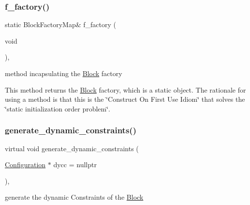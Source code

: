 \subsubsection{\texorpdfstring{f\+\_\+factory()}{f\_factory()}}
{\footnotesize\ttfamily static Block\+Factory\+Map\& f\+\_\+factory (\begin{DoxyParamCaption}\item[{void}]{ }\end{DoxyParamCaption})\hspace{0.3cm}{\ttfamily [static]}, {\ttfamily [protected]}}



method incapsulating the \mbox{\hyperlink{class_s_m_spp__di__unipi__it_1_1_block}{Block}} factory 

This method returns the \mbox{\hyperlink{class_s_m_spp__di__unipi__it_1_1_block}{Block}} factory, which is a static object. The rationale for using a method is that this is the \char`\"{}\+Construct On First Use
\+Idiom\char`\"{} that solves the \char`\"{}static initialization order problem\char`\"{}. \mbox{\label{class_s_m_spp__di__unipi__it_1_1_block_a306892932ce912f30548f3f3e4072e9b}} 
\subsubsection{\texorpdfstring{generate\+\_\+dynamic\+\_\+constraints()}{generate\_dynamic\_constraints()}}
{\footnotesize\ttfamily virtual void generate\+\_\+dynamic\+\_\+constraints (\begin{DoxyParamCaption}\item[{\mbox{\hyperlink{class_s_m_spp__di__unipi__it_1_1_configuration}{Configuration}} $\ast$}]{dycc = {\ttfamily nullptr} }\end{DoxyParamCaption})\hspace{0.3cm}{\ttfamily [inline]}, {\ttfamily [virtual]}}



generate the dynamic Constraints of the \mbox{\hyperlink{class_s_m_spp__di__unipi__it_1_1_block}{Block}} 

